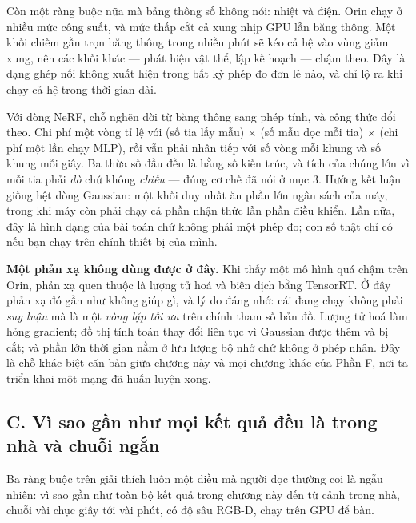 \documentclass[../../deep_learning.tex]{subfiles}
\begin{document}
Còn một ràng buộc nữa mà bảng thông số không nói: nhiệt và điện. Orin chạy ở nhiều mức công suất, và mức thấp cắt cả xung nhịp GPU lẫn băng thông. Một khối chiếm gần trọn băng thông trong nhiều phút sẽ kéo cả hệ vào vùng giảm xung, nên các khối khác --- phát hiện vật thể, lập kế hoạch --- chậm theo. Đây là dạng ghép nối không xuất hiện trong bất kỳ phép đo đơn lẻ nào, và chỉ lộ ra khi chạy cả hệ trong thời gian dài.

Với dòng NeRF, chỗ nghẽn dời từ băng thông sang phép tính, và công thức đổi theo. Chi phí một vòng tỉ lệ với (số tia lấy mẫu) \(\times\) (số mẫu dọc mỗi tia) \(\times\) (chi phí một lần chạy MLP), rồi vẫn phải nhân tiếp với số vòng mỗi khung và số khung mỗi giây. Ba thừa số đầu đều là hằng số kiến trúc, và tích của chúng lớn vì mỗi tia phải \emph{dò} chứ không \emph{chiếu} --- đúng cơ chế đã nói ở mục 3. Hướng kết luận giống hệt dòng Gaussian: một khối duy nhất ăn phần lớn ngân sách của máy, trong khi máy còn phải chạy cả phần nhận thức lẫn phần điều khiển. Lần nữa, đây là hình dạng của bài toán chứ không phải một phép đo; con số thật chỉ có nếu bạn chạy trên chính thiết bị của mình.

\noindent\textbf{Một phản xạ không dùng được ở đây.} Khi thấy một mô hình quá chậm trên Orin, phản xạ quen thuộc là lượng tử hoá và biên dịch bằng TensorRT. Ở đây phản xạ đó gần như không giúp gì, và lý do đáng nhớ: cái đang chạy không phải \emph{suy luận} mà là một \emph{vòng lặp tối ưu} trên chính tham số bản đồ. Lượng tử hoá làm hỏng gradient; đồ thị tính toán thay đổi liên tục vì Gaussian được thêm và bị cắt; và phần lớn thời gian nằm ở lưu lượng bộ nhớ chứ không ở phép nhân. Đây là chỗ khác biệt căn bản giữa chương này và mọi chương khác của Phần F, nơi ta triển khai một mạng đã huấn luyện xong.

\subsection{C. Vì sao gần như mọi kết quả đều là trong nhà và chuỗi ngắn}
Ba ràng buộc trên giải thích luôn một điều mà người đọc thường coi là ngẫu nhiên: vì sao gần như toàn bộ kết quả trong chương này đến từ cảnh trong nhà, chuỗi vài chục giây tới vài phút, có độ sâu RGB-D, chạy trên GPU để bàn.
\end{document}
